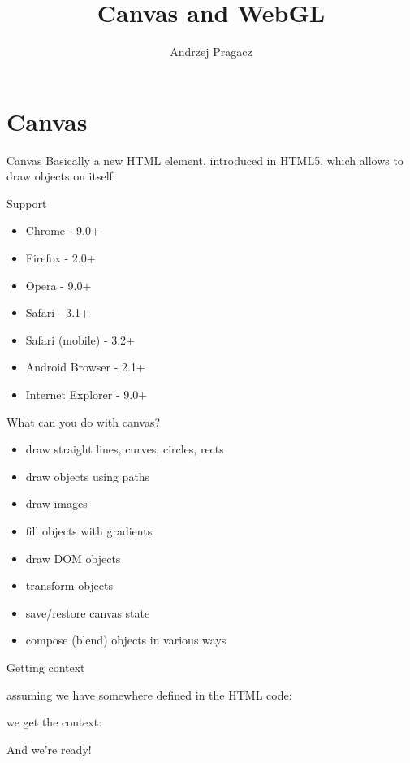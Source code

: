 \documentclass{beamer}
\title{Canvas and WebGL}
\author{Andrzej Pragacz}
\begin{document}
\titlepage

\section{Canvas}

\begin{frame}{Canvas}
Basically a new HTML element, introduced in HTML5, which allows to draw objects on itself.
\end{frame}

\begin{frame}{Support}
\begin{itemize}
\item Chrome - 9.0+
\item Firefox - 2.0+
\item Opera - 9.0+
\item Safari - 3.1+
\item Safari (mobile) - 3.2+
\item Android Browser - 2.1+
\item Internet Explorer - 9.0+
\end{itemize}
\end{frame}

\begin{frame}{What can you do with canvas?}
\begin{itemize}
    \item draw straight lines, curves, circles, rects
    \item draw objects using paths
    \item draw images
    \item fill objects with gradients
    \item draw DOM objects
    \item transform objects
    \item save/restore canvas state
    \item compose (blend) objects in various ways
\end{itemize}
\end{frame}


\begin{frame}{Getting context}

assuming we have somewhere defined in the HTML code:

\lstset{ language=HTML, basicstyle=\scriptsize,frame=single}


we get the context:



And we're ready!

\end{frame}
\end{document}
